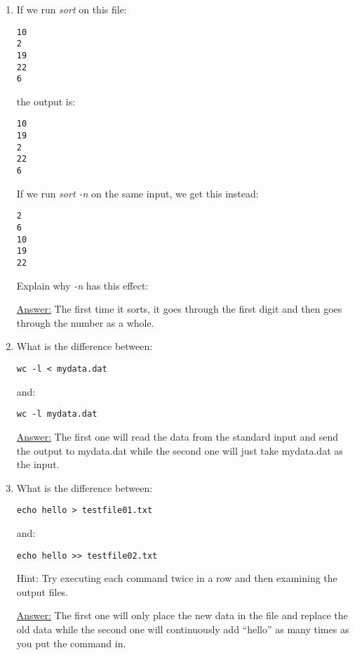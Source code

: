 \documentclass[12pt]{article}
\begin{document}
\begin{enumerate}
\item If we run \emph{sort} on this file:
\begin{flushleft}
\texttt{10 \\ 2 \\ 19 \\ 22 \\ 6}
\end{flushleft}
the output is:
\begin{flushleft}
\texttt{10 \\ 19 \\ 2 \\ 22 \\ 6}
\end{flushleft}
If we run \emph{sort -n} on the same input, we get this instead:
\begin{flushleft}
\texttt{2 \\ 6 \\ 10 \\ 19 \\ 22}
\end{flushleft}
Explain why \emph{-n} has this effect:
\begin{center}
\textsf{\underline{Answer:} The first time it sorts, it goes through the first digit and then goes through the number as a whole.}
\end{center}

\item What is the difference between:
\begin{flushleft}
\texttt{wc -l < mydata.dat}
\end{flushleft}
and:
\begin{flushleft}
\texttt{wc -l mydata.dat}
\end{flushleft}
\begin{center}
\textsf{\underline{Answer:} The first one will read the data from the standard input and send the output to mydata.dat while the second one will just take mydata.dat as the input.}\end{center}

\item What is the difference between:
\begin{flushleft}
\texttt{echo hello > testfile01.txt}
\end{flushleft}
and:
\begin{flushleft}
\texttt{echo hello >> testfile02.txt}
\end{flushleft}
Hint: Try executing each command twice in a row and then examining the output files.
\begin{center}
\textsf{\underline{Answer:} The first one will only place the new data in the file and replace the old data while the second one will continuously add “hello” as many times as you put the command in.}
\end{center}


\end{enumerate}
\end{document}
